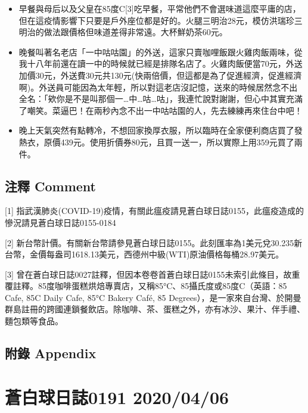 \documentclass[
]{article}
\begin{document}
\begin{enumerate}
  \begin{itemize}
  \item
    早餐與母后以及父皇在85度C{[}3{]}吃早餐，平常他們不會選味道這麼平庸的店，但在這疫情影響下只要是戶外座位都是好的。火腿三明治28元，模仿洪瑞珍三明治的做法跟價格但味道差得非常遠。大杯鮮奶茶60元。
  \item
    晚餐叫著名老店「一中咕咕園」的外送，這家只賣咖哩飯跟火雞肉飯兩味，從我十八年前還在讀一中的時候就已經是排隊名店了。火雞肉飯便當70元，外送加價30元，外送費30元共130元(快兩倍價，但這都是為了促進經濟，促進經濟啊)。外送員可能因為太年輕，所以對這老店沒記憶，送來的時候居然念不出全名：「欸你是不是叫那個一\ldots 中\ldots 咕\ldots 咕」，我連忙說對謝謝，但心中其實充滿了嘲笑。菜逼巴！在兩秒內念不出一中咕咕園的人，先去練練再來住台中吧！
  \item
    晚上天氣突然有點轉冷，不想回家換厚衣服，所以臨時在全家便利商店買了發熱衣，原價439元。使用折價券80元，且買一送一，所以實際上用359元買了兩件。
  \end{itemize}
\end{enumerate}

\hypertarget{ux6ce8ux91cb-comment-4}{%
\subsection{注釋 Comment}\label{ux6ce8ux91cb-comment-4}}

{[}1{]}
指武漢肺炎(COVID-19)疫情，有關此瘟疫請見蒼白球日誌0155，此瘟疫造成的慘況請見蒼白球日誌0155-0184

{[}2{]}
新台幣計價。有關新台幣請參見蒼白球日誌0155。此刻匯率為1美元兌30.235新台幣，金價每盎司1618.13美元，西德州中級(WTI)原油價格每桶28.97美元。

{[}3{]}
曾在蒼白球日誌0027註釋，但因本卷卷首蒼白球日誌0155未索引此條目，故重覆註釋。85度咖啡蛋糕烘焙專賣店，又稱85°C、85攝氏度或85度C（英語：85
Cafe, 85C Daily Cafe, 85°C Bakery Café, 85
Degrees），是一家來自台灣、於開曼群島註冊的跨國連鎖餐飲店。除咖啡、茶、蛋糕之外，亦有冰沙、果汁、伴手禮、麵包類等食品。

\hypertarget{ux9644ux9304-appendix-4}{%
\subsection{附錄 Appendix}\label{ux9644ux9304-appendix-4}}

\hypertarget{ux84bcux767dux7403ux65e5ux8a8c0191-20200406}{%
\section{蒼白球日誌0191
2020/04/06}\label{ux84bcux767dux7403ux65e5ux8a8c0191-20200406}}
\end{document}
